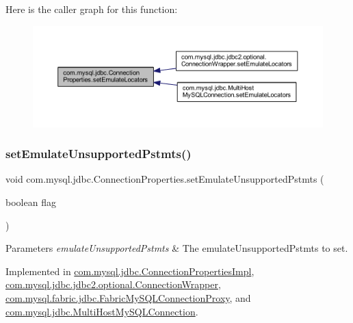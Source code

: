 Here is the caller graph for this function\+:\nopagebreak
\begin{figure}[H]
\begin{center}
\leavevmode
\includegraphics[width=350pt]{interfacecom_1_1mysql_1_1jdbc_1_1_connection_properties_a3cbd4f864707e036d8013706d632a807_icgraph}
\end{center}
\end{figure}
\mbox{\label{interfacecom_1_1mysql_1_1jdbc_1_1_connection_properties_ad1ece011a4fffaed971f9849aa966183}} 
\subsubsection{\texorpdfstring{set\+Emulate\+Unsupported\+Pstmts()}{setEmulateUnsupportedPstmts()}}
{\footnotesize\ttfamily void com.\+mysql.\+jdbc.\+Connection\+Properties.\+set\+Emulate\+Unsupported\+Pstmts (\begin{DoxyParamCaption}\item[{boolean}]{flag }\end{DoxyParamCaption})}


\begin{DoxyParams}{Parameters}
{\em emulate\+Unsupported\+Pstmts} & The emulate\+Unsupported\+Pstmts to set. \\
\hline
\end{DoxyParams}


Implemented in \mbox{\hyperlink{classcom_1_1mysql_1_1jdbc_1_1_connection_properties_impl_ac73c75361124d86d110a7c39373e2b49}{com.\+mysql.\+jdbc.\+Connection\+Properties\+Impl}}, \mbox{\hyperlink{classcom_1_1mysql_1_1jdbc_1_1jdbc2_1_1optional_1_1_connection_wrapper_a44f6dda9f93deaa617804ab20b7790d1}{com.\+mysql.\+jdbc.\+jdbc2.\+optional.\+Connection\+Wrapper}}, \mbox{\hyperlink{classcom_1_1mysql_1_1fabric_1_1jdbc_1_1_fabric_my_s_q_l_connection_proxy_a27fc1d09faaa3f44e587c4af879c9542}{com.\+mysql.\+fabric.\+jdbc.\+Fabric\+My\+S\+Q\+L\+Connection\+Proxy}}, and \mbox{\hyperlink{classcom_1_1mysql_1_1jdbc_1_1_multi_host_my_s_q_l_connection_a7c475a0b1f3d339fa0bab4863ac31609}{com.\+mysql.\+jdbc.\+Multi\+Host\+My\+S\+Q\+L\+Connection}}.

